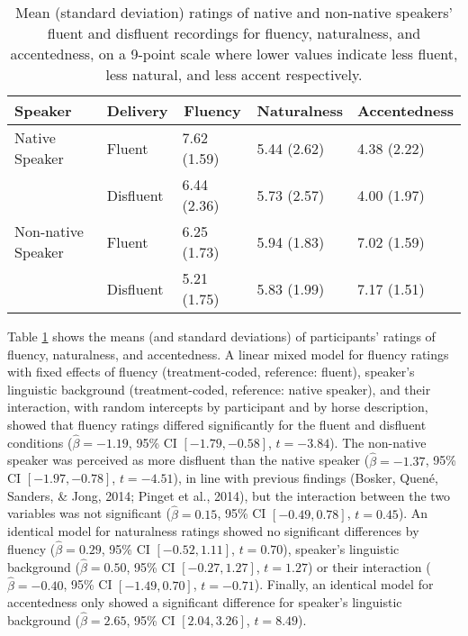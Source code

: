 \documentclass[
  man,floatsintext]{apa7}
\begin{document}
\begin{table}[tbp]

\begin{center}
\begin{threeparttable}

\caption{\label{tab:tab-results-validation}Mean (standard deviation) ratings of native and non-native speakers’ fluent and disfluent
recordings for fluency, naturalness, and accentedness, on a 9-point scale where lower values indicate
less fluent, less natural, and less accent respectively.}

\begin{tabular}{lllll}
\toprule
Speaker & \multicolumn{1}{c}{Delivery} & \multicolumn{1}{c}{Fluency} & \multicolumn{1}{c}{Naturalness} & \multicolumn{1}{c}{Accentedness}\\
\midrule
Native Speaker & Fluent & 7.62 (1.59) & 5.44 (2.62) & 4.38 (2.22)\\
 & Disfluent & 6.44 (2.36) & 5.73 (2.57) & 4.00 (1.97)\\
Non-native Speaker & Fluent & 6.25 (1.73) & 5.94 (1.83) & 7.02 (1.59)\\
 & Disfluent & 5.21 (1.75) & 5.83 (1.99) & 7.17 (1.51)\\
\bottomrule
\end{tabular}

\end{threeparttable}
\end{center}

\end{table}

Table \ref{tab:tab-results-validation} shows the means (and standard deviations) of participants' ratings of fluency, naturalness, and accentedness. A linear mixed model for fluency ratings with fixed effects of fluency (treatment-coded, reference: fluent), speaker's linguistic background (treatment-coded, reference: native speaker), and their interaction, with random intercepts by participant and by horse description, showed that fluency ratings differed significantly for the fluent and disfluent conditions (\(\hat{\beta} = -1.19\), 95\% CI \([-1.79, -0.58]\), \(t = -3.84\)). The non-native speaker was perceived as more disfluent than the native speaker (\(\hat{\beta} = -1.37\), 95\% CI \([-1.97, -0.78]\), \(t = -4.51\)), in line with previous findings (Bosker, Quené, Sanders, \& Jong, 2014; Pinget et al., 2014), but the interaction between the two variables was not significant (\(\hat{\beta} = 0.15\), 95\% CI \([-0.49, 0.78]\), \(t = 0.45\)). An identical model for naturalness ratings showed no significant differences by fluency (\(\hat{\beta} = 0.29\), 95\% CI \([-0.52, 1.11]\), \(t = 0.70\)), speaker's linguistic background (\(\hat{\beta} = 0.50\), 95\% CI \([-0.27, 1.27]\), \(t = 1.27\)) or their interaction (\(\hat{\beta} = -0.40\), 95\% CI \([-1.49, 0.70]\), \(t = -0.71\)). Finally, an identical model for accentedness only showed a significant difference for speaker's linguistic background (\(\hat{\beta} = 2.65\), 95\% CI \([2.04, 3.26]\), \(t = 8.49\)).
\end{document}

